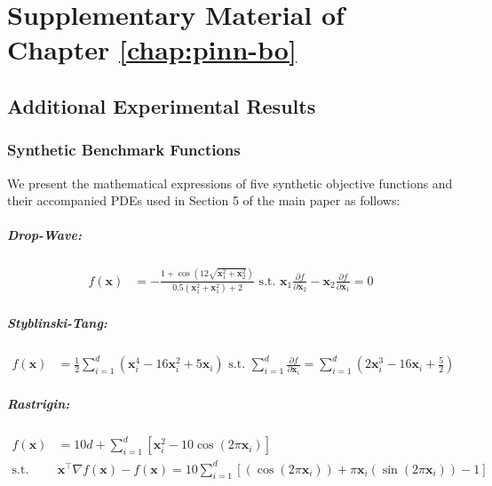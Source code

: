 \chapter{Supplementary Material of Chapter \ref{chap:pinn-bo}} 
\label{section:pinn-bo_supp}
\section{Additional Experimental Results}
\subsection{Synthetic Benchmark Functions}
\label{section:pinn-bo_experiments_synthetic}
We present the mathematical expressions of five synthetic objective functions and their accompanied PDEs used in Section 5 of the main paper as follows: 
\paragraph{Drop-Wave:} 
\begin{align*}
    f(\mathbf{x}) &= - \frac{1 + \cos(12\sqrt{\mathbf{x}_1^2 + \mathbf{x}_2^2})}{0.5(\mathbf{x}_1^2 + \mathbf{x}_1^2) + 2} \text{ s.t. } \mathbf{x}_1 \frac{\partial f}{\partial \mathbf{x}_2} - \mathbf{x}_2 \frac{\partial f}{\partial \mathbf{x}_1} = 0
\end{align*}
\paragraph{Styblinski-Tang:}
\begin{align*}
        f(\mathbf{x}) &= \frac{1}{2} \sum_{i=1}^{d} (\mathbf{x}_i^4 - 16\mathbf{x}_i^2 + 5\mathbf{x}_i) \text{ s.t. }  \sum_{i=1}^d \frac{\partial f}{\partial \mathbf{x}_i} = \sum_{i=1}^{d}(2\mathbf{x}_i^3 -16\mathbf{x}_i +\frac{5}{2})
\end{align*}

\paragraph{Rastrigin:}
\begin{align*}
        f(\mathbf{x}) &= 10d + \sum_{i=1}^{d} \left[ \mathbf{x}_i^2 - 10 \cos(2\pi \mathbf{x}_i) \right] 
        \\
        \text{s.t. }  &\mathbf{x}^\top \nabla f(\mathbf{x})  - f(\mathbf{x}) = 10\sum_{i=1}^d \left[ (\cos(2\pi \mathbf{x}_i)) + \pi \mathbf{x}_i (\sin(2\pi \mathbf{x}_i)) - 1 \right]
\end{align*}
